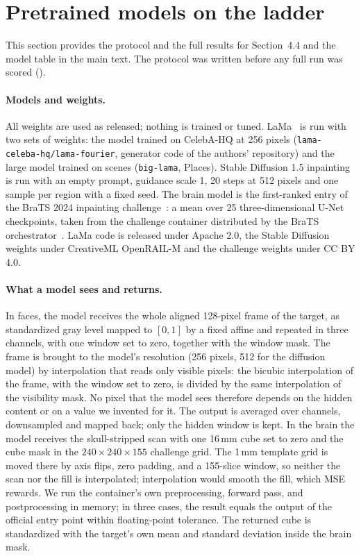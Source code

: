 \section{Pretrained models on the ladder}
\label{sec:s-models}
This section provides the protocol and the full results for Section~4.4 and the model table in the main text.
The protocol was written before any full run was scored ().

\paragraph{Models and weights.}
All weights are used as released; nothing is trained or tuned.
LaMa~\cite{lama2022} is run with two sets of weights: the model trained on CelebA-HQ at 256 pixels (\texttt{lama-celeba-hq/lama-fourier}, generator code of the authors' repository) and the large model trained on scenes (\texttt{big-lama}, Places).
Stable Diffusion 1.5 inpainting~\cite{rombach2022ldm} is run with an empty prompt, guidance scale 1, 20 steps at 512 pixels and one sample per region with a fixed seed.
The brain model is the first-ranked entry of the \ac{BraTS} 2024 inpainting challenge~\cite{brats2024winner}: a mean over 25 three-dimensional U-Net checkpoints, taken from the challenge container distributed by the \ac{BraTS} orchestrator~\cite{bratsorch2025}.
LaMa code is released under Apache 2.0, the Stable Diffusion weights under CreativeML OpenRAIL-M and the challenge weights under CC BY 4.0.

\paragraph{What a model sees and returns.}
In faces, the model receives the whole aligned 128-pixel frame of the target, as standardized gray level mapped to $[0,1]$ by a fixed affine and repeated in three channels, with one window set to zero, together with the window mask.
The frame is brought to the model's resolution (256 pixels, 512 for the diffusion model) by interpolation that reads only visible pixels: the bicubic interpolation of the frame, with the window set to zero, is divided by the same interpolation of the visibility mask.
No pixel that the model sees therefore depends on the hidden content or on a value we invented for it.
The output is averaged over channels, downsampled and mapped back; only the hidden window is kept.
In the brain the model receives the skull-stripped scan with one 16\,mm cube set to zero and the cube mask in the $240\times240\times155$ challenge grid.
The 1\,mm template grid is moved there by axis flips, zero padding, and a 155-slice window, so neither the scan nor the fill is interpolated; interpolation would smooth the fill, which \ac{MSE} rewards.
We run the container's own preprocessing, forward pass, and postprocessing in memory; in three cases, the result equals the output of the official entry point within floating-point tolerance.
The returned cube is standardized with the target's own mean and standard deviation inside the brain mask.

